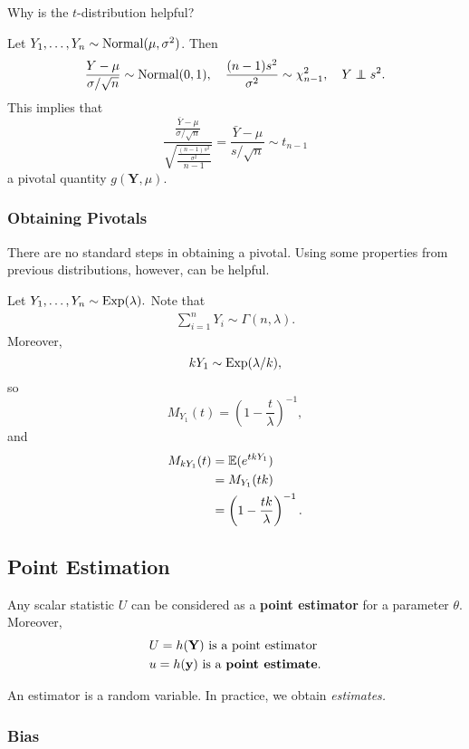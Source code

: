 Why is the $t$-distribution helpful?
\begin{eg}
Let $Y_1,\ldots, Y_n\sim \operatorname*{Normal}(\mu,\sigma^2)$. Then
$$
\frac{Y-\mu}{\sigma/\sqrt{n}}\sim \Normal(0,1), \quad \frac{(n-1)s^2}{\sigma^2}\sim \chi^2_{n-1}, \quad Y\ind s^2.
$$
This implies that
$$
\frac{\frac{\bar Y-\mu}{\sigma/\sqrt n}}{\sqrt{\frac{\frac{(n-1)s^2}{\sigma^2}}{n-1}}}=\boxed{\frac{\bar Y-\mu}{s/\sqrt n}\sim t_{n-1}}
$$
a pivotal quantity $g(\mathbf Y,\mu).$
\end{eg}

\subsubsection{Obtaining Pivotals}
There are no standard steps in obtaining a pivotal. Using some properties from previous distributions, however, can be helpful. 

\begin{eg}
Let $Y_1,\ldots,Y_n\sim \operatorname*{Exp}(\lambda).$ Note that 
\begin{align*}
    \sum_{i=1}^nY_i\sim \Gamma(n,\lambda).
\end{align*}
Moreover,
$$
kY_1\sim \operatorname*{Exp}(\lambda/k),
$$
so
\[
		M_{Y_1}(t)=\left( 1-\frac{t}{\lambda} \right)^{-1}
,\]
and
\begin{align*}
		M_{kY_1}(t)&= \mathbb E(e^{tkY_1}) \\
				   &= M_{Y_1}(tk) \\
				   &= \left( 1-\frac{tk}{\lambda} \right)^{-1}
.\end{align*} 
\end{eg}

\subsection{Point Estimation}
\begin{definition}
Any scalar statistic $U$ can be considered as a \textbf{point estimator} for a parameter $\theta.$ Moreover,
\begin{align*}
    &U=h(\mathbf Y) \text{ is a point estimator} \\
    &u=h(\mathbf y) \text{ is a \textbf{point estimate}.}
\end{align*}
\end{definition}

An estimator is a random variable. In practice, we obtain \textit{estimates.}

\subsubsection{Bias}

